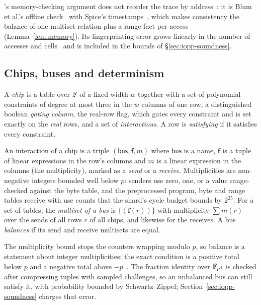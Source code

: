 \Ziren{}'s memory-checking argument does not reorder the trace by address~\citep[App.~A]{twist-shout}: it is Blum et al.'s offline check~\citep{blum1994} with Spice's timestamps~\citep{spice}, which makes consistency the balance of one multiset relation plus a range fact per access (Lemma~\ref{lem:memory}). Its fingerprinting error grows linearly in the number of accesses and cells~\citep[\S2.7]{twist-shout} and is included in the bounds of \S\ref{sec:iopp-soundness}.

\subsection{Chips, buses and determinism}
\label{sec:prelim-chips}

\begin{definition}[Chip]
\label{def:chip}
A \emph{chip} is a table over $\mathbb{F}$ of a fixed width $w$ together with a set of polynomial constraints of degree at most three in the $w$ columns of one row, a distinguished boolean \emph{gating column}, the real-row flag, which gates every constraint and is set exactly on the \emph{real} rows, and a set of \emph{interactions}. A row is \emph{satisfying} if it satisfies every constraint.
\end{definition}

\begin{definition}
\label{def:bus}
An interaction of a chip is a triple $(\mathsf{bus}, \bm f, m)$ where $\mathsf{bus}$ is a name, $\bm f$ is a tuple of linear expressions in the row's columns and $m$ is a linear expression in the columns (the multiplicity), marked as a \emph{send} or a \emph{receive}. Multiplicities are non-negative integers bounded well below $p$: senders use zero, one, or a value range-checked against the byte table, and the preprocessed program, byte and range tables receive with use counts that the shard's cycle budget bounds by $2^{25}$. For a set of tables, the \emph{multiset of a bus} is $\{(\bm f(r))\}$ with multiplicity $\sum m(r)$ over the sends of all rows $r$ of all chips, and likewise for the receives. A bus \emph{balances} if its send and receive multisets are equal.
\end{definition}

The multiplicity bound stops the counters wrapping modulo $p$, so balance is a statement about integer multiplicities; the exact condition is a positive total below $p$ and a negative total above $-p$~\citep[Cor.~3.6]{openvm-logup}. The fraction identity over $\mathbb{F}_{p^4}$ is checked after compressing tuples with sampled challenges, so an unbalanced bus can still satisfy it, with probability bounded by Schwartz--Zippel; Section~\ref{sec:iopp-soundness} charges that error.

